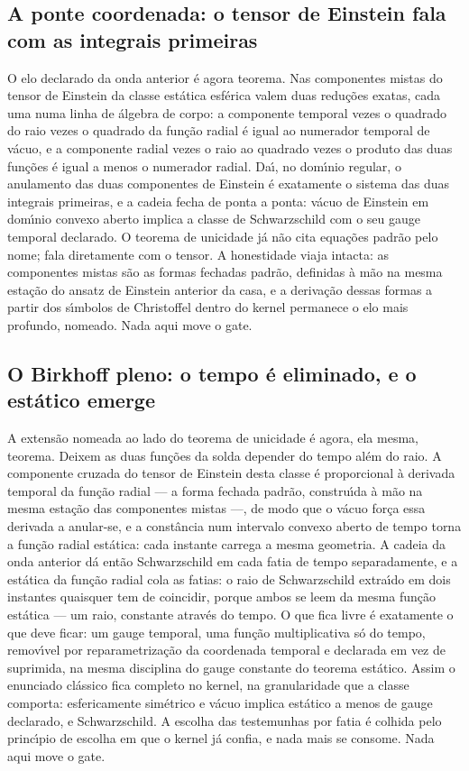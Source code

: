 \documentclass[11pt]{article}
\theoremstyle{definition}\newtheorem{deriv}{Derivação}
\begin{document}
\subsection*{A ponte coordenada: o tensor de Einstein fala com as integrais primeiras}O elo declarado da onda anterior \'e agora teorema. Nas componentes mistas do tensor de Einstein da classe est\'atica esf\'erica valem duas redu\c{c}\~oes exatas, cada uma numa linha de \'algebra de corpo: a componente temporal vezes o quadrado do raio vezes o quadrado da fun\c{c}\~ao radial \'e igual ao numerador temporal de v\'acuo, e a componente radial vezes o raio ao quadrado vezes o produto das duas fun\c{c}\~oes \'e igual a menos o numerador radial. Da\'\i{}, no dom\'\i{}nio regular, o anulamento das duas componentes de Einstein \'e exatamente o sistema das duas integrais primeiras, e a cadeia fecha de ponta a ponta: v\'acuo de Einstein em dom\'\i{}nio convexo aberto implica a classe de Schwarzschild com o seu gauge temporal declarado. O teorema de unicidade j\'a n\~ao cita equa\c{c}\~oes padr\~ao pelo nome; fala diretamente com o tensor. A honestidade viaja intacta: as componentes mistas s\~ao as formas fechadas padr\~ao, definidas \`a m\~ao na mesma esta\c{c}\~ao do ansatz de Einstein anterior da casa, e a deriva\c{c}\~ao dessas formas a partir dos s\'\i{}mbolos de Christoffel dentro do kernel permanece o elo mais profundo, nomeado. Nada aqui move o gate.

\subsection*{O Birkhoff pleno: o tempo \'e eliminado, e o est\'atico emerge}A extens\~ao nomeada ao lado do teorema de unicidade \'e agora, ela mesma, teorema. Deixem as duas fun\c{c}\~oes da solda depender do tempo al\'em do raio. A componente cruzada do tensor de Einstein desta classe \'e proporcional \`a derivada temporal da fun\c{c}\~ao radial --- a forma fechada padr\~ao, constru\'\i{}da \`a m\~ao na mesma esta\c{c}\~ao das componentes mistas ---, de modo que o v\'acuo for\c{c}a essa derivada a anular-se, e a const\^ancia num intervalo convexo aberto de tempo torna a fun\c{c}\~ao radial est\'atica: cada instante carrega a mesma geometria. A cadeia da onda anterior d\'a ent\~ao Schwarzschild em cada fatia de tempo separadamente, e a est\'atica da fun\c{c}\~ao radial cola as fatias: o raio de Schwarzschild extra\'\i{}do em dois instantes quaisquer tem de coincidir, porque ambos se leem da mesma fun\c{c}\~ao est\'atica --- um raio, constante atrav\'es do tempo. O que fica livre \'e exatamente o que deve ficar: um gauge temporal, uma fun\c{c}\~ao multiplicativa s\'o do tempo, remov\'\i{}vel por reparametriza\c{c}\~ao da coordenada temporal e declarada em vez de suprimida, na mesma disciplina do gauge constante do teorema est\'atico. Assim o enunciado cl\'assico fica completo no kernel, na granularidade que a classe comporta: esfericamente sim\'etrico e v\'acuo implica est\'atico a menos de gauge declarado, e Schwarzschild. A escolha das testemunhas por fatia \'e colhida pelo princ\'\i{}pio de escolha em que o kernel j\'a confia, e nada mais se consome. Nada aqui move o gate.
\end{document}
